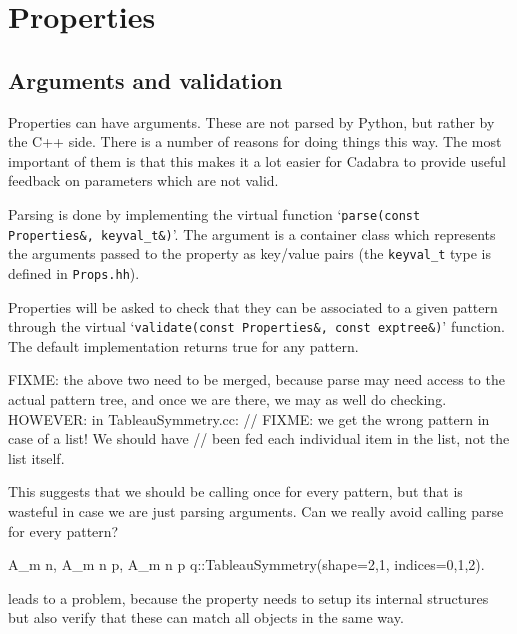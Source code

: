 
\section{Properties}

\subsection{Arguments and validation}

Properties can have arguments. These are not parsed by Python, but
rather by the C++ side. There is a number of reasons for doing things
this way. The most important of them is that this makes it a lot
easier for Cadabra to provide useful feedback on parameters which are
not valid.

Parsing is done by implementing the virtual function
`\verb|parse(const Properties&, keyval_t&)|'. The argument is a
container class which represents the arguments passed to the property
as key/value pairs (the \verb|keyval_t| type is defined in
\verb|Props.hh|).

Properties will be asked to check that they can be associated to a
given pattern through the virtual
`\verb|validate(const Properties&, const exptree&)|' function. The
default implementation returns true for any pattern.

FIXME: the above two need to be merged, because parse may need access
to the actual pattern tree, and once we are there, we may as well
do checking.
HOWEVER: in TableauSymmetry.cc:
			 // FIXME: we get the wrong pattern in case of a list! We should have
			 // been fed each individual item in the list, not the list itself.


This suggests that we should be calling once for every pattern, but 
that is wasteful in case we are just parsing arguments. Can we really
avoid calling parse for every pattern?

{A_{m n}, A_{m n p}, A_{m n p q}}::TableauSymmetry(shape={2,1}, indices={0,1,2}).

leads to a problem, because the property needs to setup its internal
structures but also verify that these can match all objects in the
same way. 
